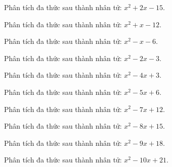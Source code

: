 \begin{bt}
	Phân tích đa thức sau thành nhân tử: $x^2 + 2 x - 15$.
\end{bt}
\begin{bt}
	Phân tích đa thức sau thành nhân tử: $x^2 + x - 12$.
\end{bt}
\begin{bt}
	Phân tích đa thức sau thành nhân tử: $x^2 - x - 6$.
\end{bt}
\begin{bt}
	Phân tích đa thức sau thành nhân tử: $x^2 - 2 x - 3$.
\end{bt}
\begin{bt}
	Phân tích đa thức sau thành nhân tử: $x^2 - 4 x + 3$.
\end{bt}
\begin{bt}
	Phân tích đa thức sau thành nhân tử: $x^2 - 5 x + 6$.
\end{bt}
\begin{bt}
	Phân tích đa thức sau thành nhân tử: $x^2 - 7 x + 12$.
\end{bt}
\begin{bt}
	Phân tích đa thức sau thành nhân tử: $x^2 - 8 x + 15$.
\end{bt}
\begin{bt}
	Phân tích đa thức sau thành nhân tử: $x^2 - 9 x + 18$.
\end{bt}
\begin{bt}
	Phân tích đa thức sau thành nhân tử: $x^2 - 10 x + 21$.
\end{bt}
